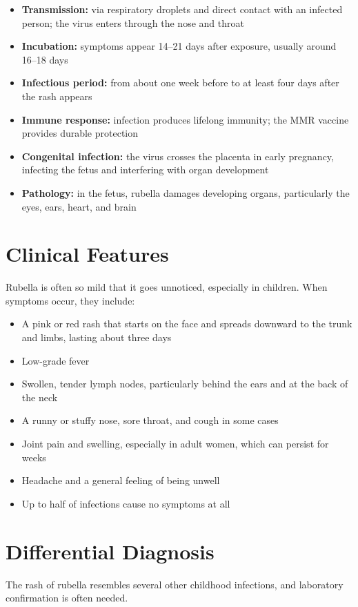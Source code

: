 \begin{itemize}
    \item \textbf{Transmission:} via respiratory droplets and direct contact with an infected person; the virus enters through the nose and throat
    \item \textbf{Incubation:} symptoms appear 14--21 days after exposure, usually around 16--18 days
    \item \textbf{Infectious period:} from about one week before to at least four days after the rash appears
    \item \textbf{Immune response:} infection produces lifelong immunity; the MMR vaccine provides durable protection
    \item \textbf{Congenital infection:} the virus crosses the placenta in early pregnancy, infecting the fetus and interfering with organ development
    \item \textbf{Pathology:} in the fetus, rubella damages developing organs, particularly the eyes, ears, heart, and brain
\end{itemize}

\section*{Clinical Features}
Rubella is often so mild that it goes unnoticed, especially in children. When symptoms occur, they include:

\begin{itemize}
    \item A pink or red rash that starts on the face and spreads downward to the trunk and limbs, lasting about three days
    \item Low-grade fever
    \item Swollen, tender lymph nodes, particularly behind the ears and at the back of the neck
    \item A runny or stuffy nose, sore throat, and cough in some cases
    \item Joint pain and swelling, especially in adult women, which can persist for weeks
    \item Headache and a general feeling of being unwell
    \item Up to half of infections cause no symptoms at all
\end{itemize}

\section*{Differential Diagnosis}
The rash of rubella resembles several other childhood infections, and laboratory confirmation is often needed.

